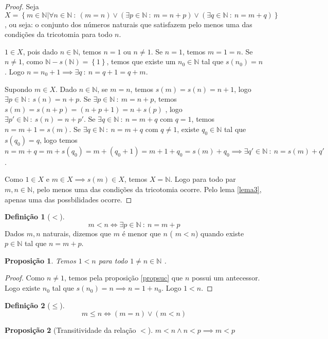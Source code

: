 \documentclass{article}
\theoremstyle{plain}
\newtheorem{prop}{Proposição}[section]
\theoremstyle{definition}
\newtheorem{definicao}{Definição}[section]
\theoremstyle{remark}
\begin{document}
\begin{proof}
	Seja $X = \left\{m \in \mathbb{N} | \forall n \in \mathbb{N} \: : \: (m = n ) \lor (	\exists p \in \mathbb{N} \: : \: m = n+p ) \lor ( 	\exists q \in \mathbb{N} \: : \: n = m+q ) \right\}$, ou seja: o conjunto dos números naturais que satisfazem pelo menos uma das condições da tricotomia para todo $n$.  

	$1\in X$, pois dado $n\in \mathbb{N}$, temos $n = 1$ ou $n\neq 1$. Se $n=1$, temos $m =1 = n$. Se $n\neq 1$, como $\mathbb{N} - s(\mathbb{N}) = \left\{1\right\}$, temos que existe um $n_0\in \mathbb{N}$ tal que $s(n_0) = n$. Logo $n = n_0 +1 \implies \exists q \: : \: n = q+1  = q+m $.
	
	Supondo $m\in X$. Dado $n\in \mathbb{N}$, se $m = n$, temos $s(m) = s(n) = n+1$, logo $\exists p \in\mathbb{N} \: : \: s(n) = n+p$. Se  $\exists p \in\mathbb{N} \: : \: m = n+p$, temos $s(m) = s(n+p) = (n+p+1) = n +s(p)$ , logo $\exists p' \in\mathbb{N} \: : \: s(n) = n+p'$. Se $\exists q \in \mathbb{N} \: : \: n = m+q $ com $q=1$, temos $n = m+1 = s(m)$. Se $\exists q \in \mathbb{N} \: : \: n = m+q $ com $q\neq 1$, existe $q_0\in \mathbb{N}$ tal que $s(q_0) = q$, logo temos $n = m+q = m +s(q_0) = m+(q_0+1) = m+1+q_0 = s(m)+q_0 \implies \exists q' \in \mathbb{N} \: : \: n = s(m)+q' $. 

	Como $1\in X$ e $m\in X \implies s(m) \in X$, temos $X = \mathbb{N}$.  Logo para todo par $m,n\in \mathbb{N}$, pelo menos uma das condições da tricotomia ocorre. Pelo lema \ref{lema3}, apenas uma das possbilidades ocorre. 
\end{proof}
\begin{definicao}[$<$]
	$$ m<n \iff \exists p\in \mathbb{N} \: : \: n = m+p$$
	Dados $m,n$ naturais, dizemos que $m$ é menor que $n$ ( $m<n$) quando existe $p\in \mathbb{N}$ tal que $n = m+p$.
\end{definicao}

\begin{prop}
	Temos $1 < n $ para todo $ 1 \neq n \in \mathbb{N}$ .
\end{prop}
\begin{proof}
	Como $n \neq 1$, temos pela proposição \ref{propsuc} que $n$ possui um antecessor. Logo existe $n_0$ tal que $s(n_0) =n \implies n  = 1+n_0$. Logo $1<n$.
\end{proof}
\begin{definicao}[$\leq$]
	$$m \leq n \iff (m = n) \lor (m <n)$$
\end{definicao}
\begin{prop}[Transitividade da relação $<$]
	$m< n \land n< p \implies m < p$
\end{prop}
\end{document}
